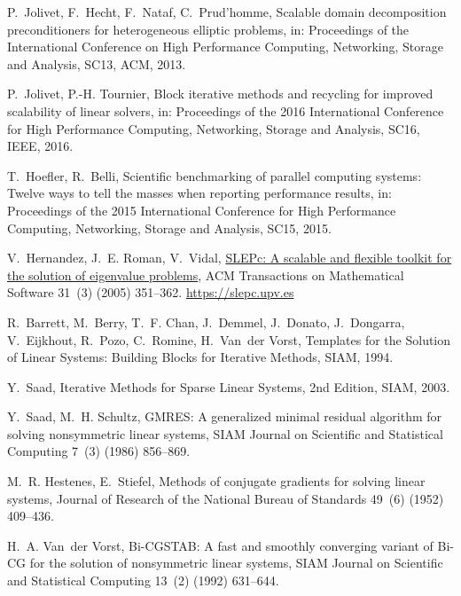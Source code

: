\documentclass[3p,11pt]{elsarticle}
\begin{document}
\begin{thebibliography}{10}
P.~Jolivet, F.~Hecht, F.~Nataf, C.~Prud'homme, Scalable domain decomposition
  preconditioners for heterogeneous elliptic problems, in: Proceedings of the
  International Conference on High Performance Computing, Networking, Storage
  and Analysis, SC13, ACM, 2013.

P.~Jolivet, P.-H. Tournier, Block iterative methods and recycling for improved
  scalability of linear solvers, in: Proceedings of the 2016 International
  Conference for High Performance Computing, Networking, Storage and Analysis,
  SC16, IEEE, 2016.

T.~Hoefler, R.~Belli, Scientific benchmarking of parallel computing systems:
  Twelve ways to tell the masses when reporting performance results, in:
  Proceedings of the 2015 International Conference for High Performance
  Computing, Networking, Storage and Analysis, SC15, 2015.

V.~Hernandez, J.~E. Roman, V.~Vidal, \href{https://slepc.upv.es}{{SLEP}c: A
  scalable and flexible toolkit for the solution of eigenvalue problems}, ACM
  Transactions on Mathematical Software 31~(3) (2005) 351--362.
\newline\urlprefix\url{https://slepc.upv.es}

R.~Barrett, M.~Berry, T.~F. Chan, J.~Demmel, J.~Donato, J.~Dongarra,
  V.~Eijkhout, R.~Pozo, C.~Romine, H.~Van~der Vorst, Templates for the Solution
  of Linear Systems: Building Blocks for Iterative Methods, SIAM, 1994.

Y.~Saad, Iterative Methods for Sparse Linear Systems, 2nd Edition, SIAM, 2003.

Y.~Saad, M.~H. Schultz, {GMRES}: A generalized minimal residual algorithm for
  solving nonsymmetric linear systems, SIAM Journal on Scientific and
  Statistical Computing 7~(3) (1986) 856--869.

M.~R. Hestenes, E.~Stiefel, Methods of conjugate gradients for solving linear
  systems, Journal of Research of the National Bureau of Standards 49~(6)
  (1952) 409--436.

H.~A. Van~der Vorst, {Bi-CGSTAB}: A fast and smoothly converging variant of
  {Bi-CG} for the solution of nonsymmetric linear systems, SIAM Journal on
  Scientific and Statistical Computing 13~(2) (1992) 631--644.


\end{thebibliography}
\end{document}
